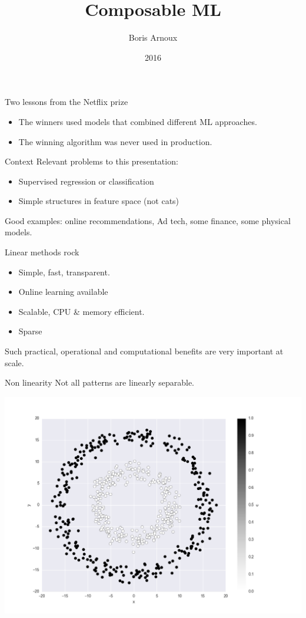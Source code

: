 \documentclass[11pt]{beamer}
\author{Boris Arnoux}
\title{Composable ML}
\date{2016}
\begin{document}
\begin{frame}
\titlepage
\end{frame}



\begin{frame}{Two lessons from the Netflix prize}
\begin{itemize}
\item The winners used models that combined different ML approaches.
\item The winning algorithm was never used in production.
\end{itemize}
\end{frame}

\begin{frame}{Context}
Relevant problems to this presentation:
\begin{itemize}
\item Supervised regression or classification
\item Simple structures in feature space (not cats)
\end{itemize}
Good examples: online recommendations, Ad tech, some finance, some physical models. 
\end{frame}


\begin{frame}{Linear methods rock}
\begin{itemize}
\item Simple, fast, transparent.
\item Online learning available
\item Scalable, CPU \& memory efficient.
\item Sparse
\end{itemize}
Such practical, operational and computational benefits are very important at scale.
\end{frame}

\begin{frame}{Non linearity}
Not all patterns are linearly separable.
\pause
\begin{center}
\includegraphics[scale=0.25]{circle_dataset.png} 
\end{center}
\end{frame}
\end{document}
